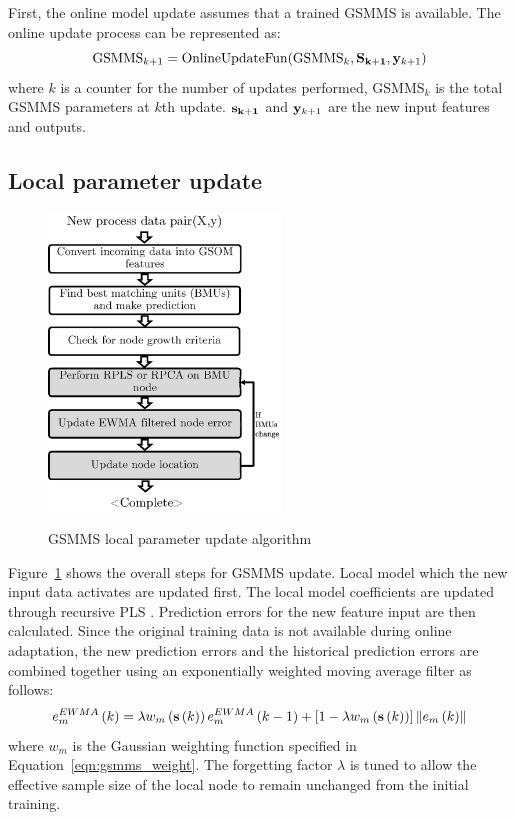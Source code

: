 \documentclass[review,3p]{elsarticle}
\renewcommand\[{\begin{equation}}
\renewcommand\]{\end{equation}}
\begin{document}
First, the online model update assumes that a trained GSMMS is available. The online update process can be represented as:
\[
\mathrm{GSMMS}_{k+1} = \mathrm{OnlineUpdateFun}(\mathrm{GSMMS}_k, {\bf{S}_{k+1}},{\bf y}_{k+1})
\]
where $k$ is a counter for the number of updates performed, $\mathrm{GSMMS}_k$ is the
total GSMMS parameters at $k$th update. $\bf{s}_{k+1}$ and ${\bf y}_{k+1}$ are the new input features and outputs.

\subsection{Local parameter update}
\begin{figure}
  \centering
  \includegraphics[width=0.55\textwidth]{figures/gsmms/gsmms_model_update.eps}\\
  \caption{GSMMS local parameter update algorithm}\label{fig:gsmms_model_update}
\end{figure}

Figure~\ref{fig:gsmms_model_update} shows the overall steps for GSMMS update. Local model which the new input data activates are updated first. The local model coefficients are updated through recursive PLS \cite{Li2000a,Qin1998}.
Prediction errors for the new feature input are then calculated. Since the original training data is not available during online adaptation, the new prediction errors and the historical prediction errors are combined together using an exponentially weighted moving average filter as follows:
\[e_m^{EWMA}\left( k \right) = \lambda {w_m}\left( {{\bf{s}}\left( k \right)} \right)e_m^{EWMA}\left( {k - 1} \right) + \left[ {1 - \lambda {w_m}\left( {{\bf{s}}\left( k \right)} \right)} \right]\left\| {{e_m}\left( k \right)} \right\|\]
where ${w_m}$ is the Gaussian weighting function specified in Equation~\ref{eqn:gsmms_weight}. The forgetting factor $\lambda$ is tuned to allow the effective sample size of the local node to remain unchanged from the initial training.
\end{document}
